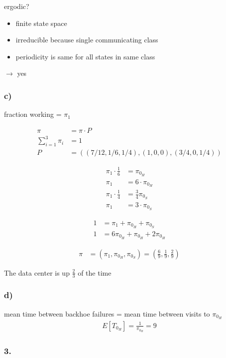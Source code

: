 ergodic?
\begin{itemize}
\item  finite state space
\item  irreducible because single communicating class
\item  periodicity is same for all states in same class
\end{itemize}
$\rightarrow$ yes

\subsubsection*{ c) }

fraction working = $\pi_1$

\begin{align*}
\pi &= \pi \cdot P\\
\sum_{i=1}^3 \pi_i &= 1\\
P &= ((7/12,1/6,1/4),(1,0,0),(3/4,0,1/4))
\end{align*}

\begin{align*}
\pi _{1}\cdot \frac{1}{6}&=\pi _{{0_{H}}}\\
\pi _{1}&=6\cdot \pi _{{0_{H}}}\\
\pi _{1}\cdot \frac{1}{4}&=\frac{3}{4}\pi _{{0_{S}}}\\
\pi _{1}&=3\cdot \pi _{{0_{S}}}
\end{align*}

\begin{align*}
1&=\pi _{1}+\pi _{{0_{H}}}+\pi _{{0_{S}}}\\
1&=6\pi _{{0_{H}}}+\pi _{{0_{H}}}+2\pi _{{0_{H}}}
\end{align*}

\begin{align*}
\pi &=\left(\pi _{1},\pi _{{0_{H}}},\pi _{{0_{S}}}\right)=\left(\frac{6}{9},\frac{1}{9},\frac{2}{9}\right)
\end{align*}

The data center is up $\frac{2}{3}$ of the time

\subsubsection*{ d) }

mean time between backhoe failures = mean time between visits to $\pi _{0_H}$
\begin{align*}
E[T_{0_H}] = \frac{1}{\pi_{0_H}} = 9
\end{align*}

\subsubsection*{ 3. }

